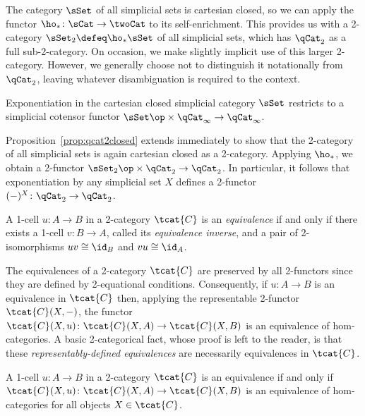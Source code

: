 \begin{defn}\label{defn:2-cat.of.all.simpsets}
  The category $\sSet$ of all simplicial sets is cartesian closed, so we can apply the functor $\ho_*\colon\sCat\to\twoCat$ to its self-enrichment. This provides us with a 2-category $\sSet_2 \defeq \ho_*\sSet$ of all simplicial sets, which has $\qCat_2$ as a full sub-2-category. On occasion, we make slightly implicit use of this larger 2-category. However, we generally choose not to distinguish it notationally from $\qCat_2$, leaving whatever disambiguation is required to the context. 
\end{defn}

\begin{rmk}\label{rmk:exp2functor} 
Exponentiation in the cartesian closed simplicial category $\sSet$ restricts to a simplicial cotensor functor $\sSet\op\times\qCat_\infty\to\qCat_\infty$.

Proposition~\ref{prop:qcat2closed} extends immediately to show that the 2-category of all simplicial sets is again cartesian closed as a 2-category.  Applying $\ho_*$, we obtain a 2-functor $\sSet_2\op\times\qCat_2\to\qCat_2$.  In particular, it follows that exponentiation by any simplicial set $X$ defines a 2-functor $(-)^X \colon \qCat_2 \to \qCat_2$.
  \end{rmk}

\begin{defn}
A 1-cell $u\colon A\to B$ in a 2-category $\tcat{C}$ is an {\em equivalence\/} if and only if there exists a 1-cell $v\colon B\to A$, called its {\em equivalence inverse}, and a pair of 2-isomorphisms $uv\cong\id_B$ and $vu\cong\id_A$. 
\end{defn}

The equivalences of a 2-category $\tcat{C}$ are preserved by all 2-functors since they are defined by 2-equational conditions. Consequently, if $u\colon A\to B$ is an equivalence in $\tcat{C}$ then, applying the representable 2-functor $\tcat{C}(X,-)$,  the functor $\tcat{C}(X,u)\colon\tcat{C}(X,A)\to \tcat{C}(X,B)$ is an equivalence of hom-categories. A basic 2-categorical fact, whose proof is left to the reader, is that these \emph{representably-defined equivalences} are necessarily equivalences in $\tcat{C}$.

\begin{lem}\label{lem:2-cat.equivs}
A 1-cell $u\colon A\to B$ in a 2-category $\tcat{C}$ is an equivalence if and only if $\tcat{C}(X,u)\colon\tcat{C}(X,A)\to \tcat{C}(X,B)$ is an equivalence of hom-categories for all objects $X \in \tcat{C}$. 
\end{lem}


